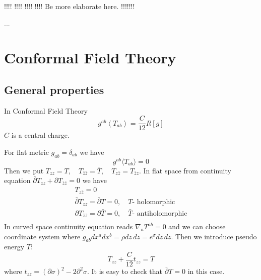 \documentclass[a4paper,12pt]{article}
\theoremstyle{definition} \newtheorem{Def}{Definition}
\begin{document}
!!!! !!!! !!!! !!!! 
Be more elaborate here.
!!!!!!!

...
\section{Conformal Field Theory}
\label{sec:cft}

\subsection{General properties}
\label{sec:general-properties}


In Conformal Field Theory 
\begin{equation}
  \label{eq:46}
  g^{ab}\left<T_{ab}\right>=\frac{C}{12}R[g]
\end{equation}
$C$ is a central charge.

For flat metric $g_{ab}=\delta_{ab}$ we have
\begin{equation}
  \label{eq:47}
  g^{ab}\langle T_{ab} \rangle=0
\end{equation}
Then we put $T_{zz}=T,\quad T_{\bar{z}\bar{z}}=\bar{T},\quad T_{z\bar{z}}=T_{\bar{z}z}$. In flat space from continuity equation $\bar{\partial}T_{zz}+\partial T_{\bar{z}\bar{z}}=0$ we have
\begin{equation}
  \label{eq:49}
  \begin{split}
    T_{z\bar{z}}=0\\
    \bar{\partial}T_{zz}=\bar{\partial}T=0,\quad T \mbox{- holomorphic}\\
    \partial T_{\bar{z}\bar{z}}=\partial \bar{T}=0,\quad \bar{T} \mbox{- antiholomorphic}\\
  \end{split}
\end{equation}
In curved space continuity equation reads $\nabla_a T^{ab}=0$ and we can choose coordinate system where $g_{ab}dx^a dx^b = \rho dz\, d\bar{z}=e^{\sigma}dz\,d\bar{z}$. Then we introduce pseudo energy $T$:
\begin{equation}
  \label{eq:50}
  T_{zz}+\frac{C}{12}t_{zz}=T
\end{equation}
where $t_{zz}=(\partial \sigma)^2-2\partial^2 \sigma$. It is easy to check that $\bar{\partial}T=0$ in this case.
\end{document}
